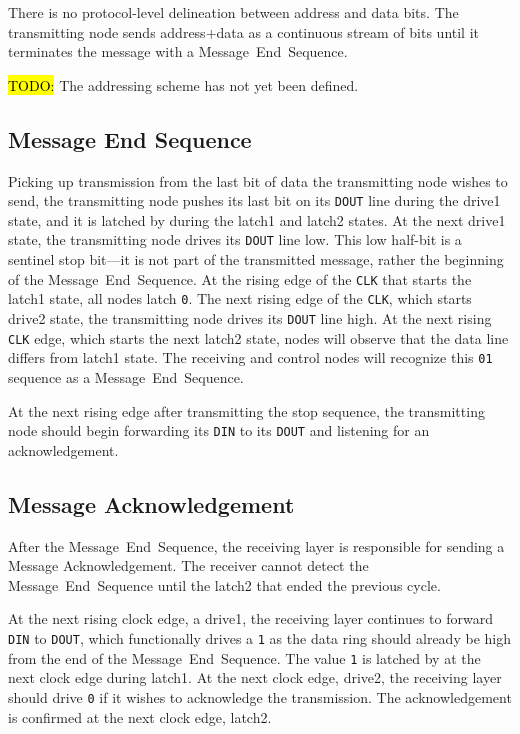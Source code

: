 There is no protocol-level delineation between address and data bits. The
transmitting node sends address$+$data as a continuous stream of bits until
it terminates the message with a Message~End~Sequence.

\hl{TODO:} The \bus addressing scheme has not yet been defined.

\subsection{Message End Sequence}
\label{sec:protocol-end}
Picking up transmission from the last bit of data the transmitting node wishes
to send, the transmitting node pushes its last bit on its {\tt DOUT} line
during the {\sc drive1} state, and it is latched by \bus during the {\sc
latch1} and {\sc latch2} states.  At the next {\sc drive1} state, the 
transmitting node drives its {\tt DOUT} line low. This low half-bit is a sentinel 
stop bit---it is not part of the transmitted message, rather the beginning of 
the Message~End~Sequence. At the rising edge of the {\tt CLK} that starts the
{\sc latch1} state, all \bus nodes latch {\tt 0}. The next rising edge of the
{\tt CLK}, which starts {\sc drive2} state, the transmitting node drives its 
{\tt DOUT} line high. At the next rising {\tt CLK} edge, which starts the next 
{\sc latch2} state, nodes will observe that the data line differs from 
{\sc latch1} state. The receiving and control nodes will recognize this
{\tt 01} sequence as a Message~End~Sequence.

At the next rising edge after transmitting the stop sequence, the transmitting
node should begin forwarding its {\tt DIN} to its {\tt DOUT} and listening for
an acknowledgement.

\subsection{Message Acknowledgement}
\label{sec:protocol-ack}
After the Message~End~Sequence, the receiving layer is responsible for sending a
Message Acknowledgement. The receiver cannot detect the Message~End~Sequence
until the {\sc latch2} that ended the previous cycle.

At the next rising clock edge, a {\sc drive1}, the receiving layer continues
to forward {\tt DIN} to {\tt DOUT}, which functionally drives a {\tt 1} as the
data ring should already be high from the end of the Message~End~Sequence. The
value {\tt 1} is latched by \bus at the next clock edge during {\sc latch1}.
At the next clock edge, {\sc drive2}, the receiving layer should drive {\tt 0}
if it wishes to acknowledge the transmission. The acknowledgement is confirmed
at the next clock edge, {\sc latch2}.

